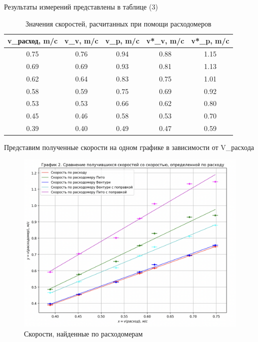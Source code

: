 \documentclass[a4paper,12pt]{article} %
\begin{document}
Результаты измерений представлены в таблице (3)

\begin{table}[H]
\begin{center}
    \begin{tabular}{|c|c|c|c|c|}
    \hline
    v_{расход}, m/c & v_{v}, m/c & v_{p}, m/c & v*_{v}, m/c & v*_{p}, m/c\\ \hline
    0.75 & 0.76 & 0.94 & 0.88 & 1.15 \\ \hline
    0.69 & 0.69 & 0.93 & 0.81 & 1.13 \\ \hline
    0.62 & 0.64 & 0.83 & 0.75 & 1.01  \\ \hline
    0.58 & 0.59 & 0.75 & 0.69 & 0.92 \\ \hline
    0.53 & 0.53 & 0.66 & 0.62 & 0.80 \\ \hline
    0.45 & 0.46 & 0.58 & 0.53 & 0.70 \\ \hline
    0.39 & 0.40 & 0.49 & 0.47 & 0.59 \\ \hline
    \end{tabular}
    \label{sensitivity}
    \caption {Значения скоростей, расчитанных при помощи расходомеров}
\end{center}
\end{table}

Представим полученные скорости на одном графике в зависимости от V_{расхода}

\begin{figure}[H]
	\begin{center}
		\includegraphics[width=18cm]{Snimok_Ekrana_2023-06-11_V_20_11_03.png}
	\end{center}
	\caption{Скорости, найденные по расходомерам}
	\label{ust}
\end{figure}
\end{document}

